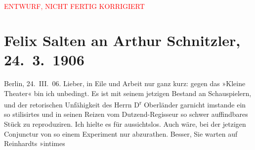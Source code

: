 
\begin{center}
            \textcolor{red}{ENTWURF, NICHT FERTIG KORRIGIERT}
                      \end{center}
            
         
         \renewcommand{\erwaehntePersonen}{Personen: Hermann Bahr, Hans Oberländer, Max Reinhardt, Ottilie Salten, Olga Schnitzler}
         \renewcommand{\erwaehnteInstitutionen}{Institutionen: Deutsches Theater Berlin, Kleines Theater}
         \renewcommand{\erwaehnteOrte}{Orte: Berlin, Wien}
         \renewcommand{\erwaehnteWerke}{Werke: Zum großen Wurstel. Burleske in einem Akt}
               \section[Felix Salten an Arthur Schnitzler, 24. 3. 1906]{ Felix Salten an Arthur Schnitzler, 24. 3. 1906}\nopagebreak{}\rehead{ }\begin{ledgroupsized}[t]{13cm}\normalsize\beginnumbering \toendnotes[C]{\smallbreak\pagebreak[2]} 
\toendnotes[C]{\smallbreak}\pstart
           \raggedleft{}{\pb}Berlin, 24. III. 06. \pend
           \pstart
           Lieber, in Eile und Arbeit nur ganz kurz: gegen das »Kleine Theater« bin ich unbedingt. Es ist mit seinem jetzigen
               Bestand an Schauspielern, und der retorischen Unfähigkeit des Herrn D\textsuperscript{r}{ }Oberländer garnicht imstande ein so
               stilisirtes und in seinen Reizen vom Dutzend-Regisseur so schwer auffindbares Stück zu
               reproduziren. Ich hielte es für aussichtslos. Auch wäre, bei der jetzigen Conjunctur
               von so einem Experiment nur abzurathen. Besser, Sie warten auf Reinhardts »intimes

\end{ledgroupsized}
